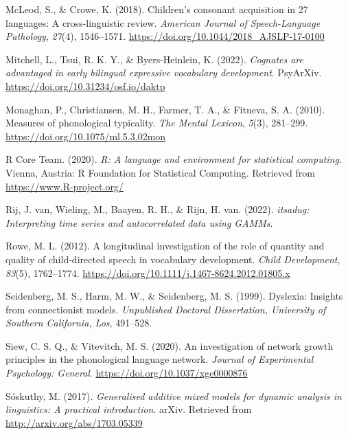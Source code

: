 \documentclass[
  man]{apa6}
\newlength{\cslhangindent}
\newlength{\cslentryspacingunit} %
\newenvironment{CSLReferences}[2] %
 {%
  \setlength{\parindent}{0pt}
  \ifodd #1
  \let\oldpar\par
  \def\par{\hangindent=\cslhangindent\oldpar}
  \fi
  \setlength{\parskip}{#2\cslentryspacingunit}
 }%
 {}
\begin{document}
\begin{CSLReferences}{1}{0}
\leavevmode{}%
McLeod, S., \& Crowe, K. (2018). Children's consonant acquisition in 27 languages: A cross-linguistic review. \emph{American Journal of Speech-Language Pathology}, \emph{27}(4), 1546--1571. \url{https://doi.org/10.1044/2018_AJSLP-17-0100}

\leavevmode{}%
Mitchell, L., Tsui, R. K. Y., \& Byers-Heinlein, K. (2022). \emph{Cognates are advantaged in early bilingual expressive vocabulary development}. {PsyArXiv}. \url{https://doi.org/10.31234/osf.io/daktp}

\leavevmode{}%
Monaghan, P., Christiansen, M. H., Farmer, T. A., \& Fitneva, S. A. (2010). Measures of phonological typicality. \emph{The Mental Lexicon}, \emph{5}(3), 281--299. \url{https://doi.org/10.1075/ml.5.3.02mon}

\leavevmode{}%
R Core Team. (2020). \emph{R: A language and environment for statistical computing}. Vienna, Austria: R Foundation for Statistical Computing. Retrieved from \url{https://www.R-project.org/}

\leavevmode{}%
Rij, J. van, Wieling, M., Baayen, R. H., \& Rijn, H. van. (2022). \emph{{itsadug}: Interpreting time series and autocorrelated data using GAMMs}.

\leavevmode{}%
Rowe, M. L. (2012). A longitudinal investigation of the role of quantity and quality of child-directed speech in vocabulary development. \emph{Child Development}, \emph{83}(5), 1762--1774. \url{https://doi.org/10.1111/j.1467-8624.2012.01805.x}

\leavevmode{}%
Seidenberg, M. S., Harm, M. W., \& Seidenberg, M. S. (1999). Dyslexia: Insights from connectionist models. \emph{Unpublished Doctoral Dissertation, University of Southern California, Los}, 491--528.

\leavevmode{}%
Siew, C. S. Q., \& Vitevitch, M. S. (2020). An investigation of network growth principles in the phonological language network. \emph{Journal of Experimental Psychology: General}. \url{https://doi.org/10.1037/xge0000876}

\leavevmode{}%
Sóskuthy, M. (2017). \emph{Generalised additive mixed models for dynamic analysis in linguistics: A practical introduction}. arXiv. Retrieved from \url{http://arxiv.org/abs/1703.05339}


\end{CSLReferences}
\end{document}

